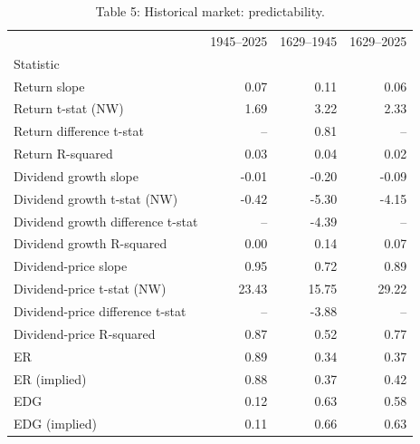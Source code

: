 \begin{table}
\caption{Table 5: Historical market: predictability.}
\label{tab:replication_5}
\begin{tabular}{lrrr}
\toprule
 & 1945–2025 & 1629–1945 & 1629–2025 \\
Statistic &  &  &  \\
\midrule
Return slope & 0.07 & 0.11 & 0.06 \\
Return t-stat (NW) & 1.69 & 3.22 & 2.33 \\
Return difference t-stat & -- & 0.81 & -- \\
Return R-squared & 0.03 & 0.04 & 0.02 \\
Dividend growth slope & -0.01 & -0.20 & -0.09 \\
Dividend growth t-stat (NW) & -0.42 & -5.30 & -4.15 \\
Dividend growth difference t-stat & -- & -4.39 & -- \\
Dividend growth R-squared & 0.00 & 0.14 & 0.07 \\
Dividend-price slope & 0.95 & 0.72 & 0.89 \\
Dividend-price t-stat (NW) & 23.43 & 15.75 & 29.22 \\
Dividend-price difference t-stat & -- & -3.88 & -- \\
Dividend-price R-squared & 0.87 & 0.52 & 0.77 \\
ER & 0.89 & 0.34 & 0.37 \\
ER (implied) & 0.88 & 0.37 & 0.42 \\
EDG & 0.12 & 0.63 & 0.58 \\
EDG (implied) & 0.11 & 0.66 & 0.63 \\
\bottomrule
\end{tabular}
\end{table}

